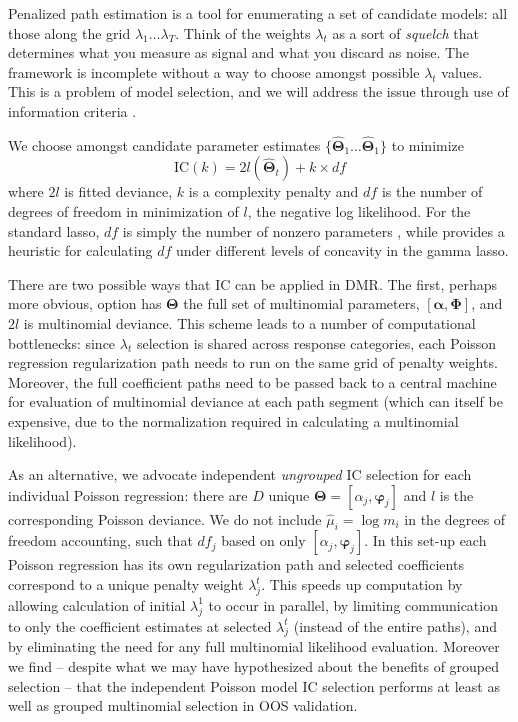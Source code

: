 \documentclass[12pt]{article}
\newcommand{\bs}[1]{\boldsymbol{#1}}
\begin{document}
Penalized path estimation is a tool for enumerating a set of candidate models:
all those along the grid $\lambda_1 \ldots \lambda_T$.  Think of the weights
$\lambda_t$ as a sort of {\it squelch} that determines what you measure as
signal and what you discard as noise.  The framework is incomplete
without  a way to choose amongst possible $\lambda_t$ values.  This is  a
problem of model selection, and we will address the issue through use of
information criteria \citep[IC; e.g.,][]{efron_estimation_2004}.  

We choose amongst  candidate
parameter estimates $\{\bs{\hat\Theta}_1 \ldots \bs{\hat\Theta}_1 \}$ to
minimize \begin{equation}\label{cp} \text{IC}(k) = 2l(\bs{\hat\Theta}_t ) +
k\times df \end{equation} where $2l$ is fitted deviance,   $k$ is a complexity
penalty and $df$ is the number of degrees of freedom in minimization of $l$,
the negative log likelihood.   For the standard lasso, $df$ is simply the
number of nonzero parameters \citep{zou_degrees_2007}, while
\cite{taddy_gamma_2013} provides a heuristic for calculating $df$ under
different levels of concavity in the gamma lasso.

There are two possible ways that IC can be applied in DMR.  The first, perhaps more obvious, option has $\bs{\Theta}$ the full set of multinomial parameters, $[\bs{\alpha},\bs{\Phi}]$, and $2l$ is multinomial deviance.  This scheme leads to a number of computational bottlenecks: since $\lambda_t$ selection is shared across response categories, each 
 Poisson regression regularization path needs to run on the same grid of penalty weights.  Moreover, the full coefficient paths need to be passed back to a central machine for evaluation of multinomial deviance at each path segment (which can itself be expensive, due to the normalization required in calculating a multinomial likelihood).  

As an alternative, we advocate independent {\it ungrouped} IC selection for each individual Poisson regression: there are $D$ unique $\bs{\Theta} = [\alpha_j,\bs{\varphi}_j]$ and $l$ is 
the corresponding Poisson deviance.  We do not include $\hat \mu_i = \log m_i$ in the degrees of freedom accounting, such that $df_j$ based on only $[\alpha_j,\bs{\varphi}_j]$.
In this set-up each Poisson regression has its own
regularization path and selected coefficients correspond to a unique penalty weight $\lambda^t_j$.  This speeds up computation by allowing calculation of initial $\lambda^1_j$ to occur in parallel, by limiting communication to only the coefficient estimates at selected $\lambda^t_j$ (instead of the entire paths), and by eliminating the need for any full multinomial likelihood evaluation.  Moreover we find -- despite what we may have hypothesized about the benefits of grouped selection -- that the independent Poisson model IC selection performs at least as well as grouped multinomial selection in OOS validation.  
\end{document}
